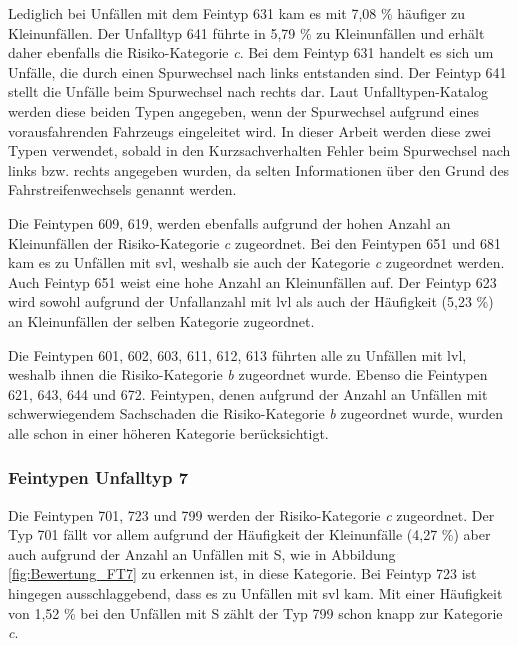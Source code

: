 Lediglich bei Unfällen mit dem Feintyp 631 kam es mit 7,08 \% häufiger zu Kleinunfällen. Der Unfalltyp 641 führte in 5,79 \% zu Kleinunfällen und erhält daher ebenfalls die Risiko-Kategorie \textit{c}. Bei dem Feintyp 631 handelt es sich um Unfälle, die durch einen Spurwechsel nach links entstanden sind. Der Feintyp 641 stellt die Unfälle beim Spurwechsel nach rechts dar. Laut Unfalltypen-Katalog werden diese beiden Typen angegeben, wenn der Spurwechsel aufgrund eines vorausfahrenden Fahrzeugs eingeleitet wird. In dieser Arbeit werden diese zwei Typen verwendet, sobald in den Kurzsachverhalten Fehler beim Spurwechsel nach links bzw. rechts angegeben wurden, da selten Informationen über den Grund des Fahrstreifenwechsels genannt werden.  

Die Feintypen 609, 619, werden ebenfalls aufgrund der hohen Anzahl an Kleinunfällen der Risiko-Kategorie \textit{c} zugeordnet. Bei den Feintypen 651 und 681 kam es zu Unfällen mit \ac{svl}, weshalb sie auch der Kategorie \textit{c} zugeordnet werden. Auch Feintyp 651 weist eine hohe Anzahl an Kleinunfällen auf. Der Feintyp 623 wird sowohl aufgrund der Unfallanzahl mit \ac{lvl} als auch der Häufigkeit (5,23 \%) an Kleinunfällen der selben Kategorie zugeordnet.

Die Feintypen 601, 602, 603, 611, 612, 613 führten alle zu Unfällen mit \ac{lvl}, weshalb ihnen die Risiko-Kategorie \textit{b} zugeordnet wurde. Ebenso die Feintypen 621, 643, 644 und 672. Feintypen, denen aufgrund der Anzahl an Unfällen mit schwerwiegendem Sachschaden die Risiko-Kategorie \textit{b} zugeordnet wurde, wurden alle schon in einer höheren Kategorie berücksichtigt.   

\subsubsection{Feintypen Unfalltyp 7}
Die Feintypen 701, 723 und 799 werden der Risiko-Kategorie \textit{c} zugeordnet. Der Typ 701 fällt vor allem aufgrund der Häufigkeit der Kleinunfälle (4,27 \%) aber auch aufgrund der Anzahl an Unfällen mit \ac{S}, wie in Abbildung \ref{fig:Bewertung_FT7} zu erkennen ist, in diese Kategorie. Bei Feintyp 723 ist hingegen ausschlaggebend, dass es zu Unfällen mit \ac{svl} kam. Mit einer Häufigkeit von 1,52 \% bei den Unfällen mit \ac{S} zählt der Typ 799 schon knapp zur Kategorie \textit{c}.

